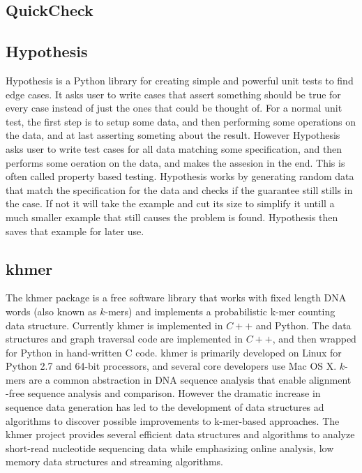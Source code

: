 \documentclass[preprint,nocopyrightspace]{sig-alternate}
\begin{document}
\subsection{QuickCheck}

\subsection{Hypothesis}
Hypothesis is a Python library for creating simple and powerful unit tests to find edge cases. It asks user to write cases that assert something should be true for every case instead of just the ones that could be thought of. For a normal unit test, the first step is to setup some data, and then performing some operations on the data, and at last asserting someting about the result. However Hypothesis asks user to write test cases for all data matching some specification, and then performs some oeration on the data, and makes the assesion in the end. This is often called property based testing. Hypothesis works by generating random data that match the specification for the data and checks if the guarantee still stills in the case. If not it will take the example and cut its size to simplify it untill a much smaller example that still causes the problem is found. Hypothesis then saves that example for later use.

\subsection{khmer}
The khmer package is a free software library that works with fixed length DNA words (also known as $k$-mers) and implements a probabilistic k-mer counting data structure. Currently khmer is implemented in $C++$ and Python. The data structures and graph traversal code are implemented in $C++$, and then wrapped for Python in hand-written C code. khmer is primarily developed on Linux for Python 2.7 and 64-bit processors, and several core developers use Mac OS X. $k$-mers are a common abstraction in DNA sequence analysis that enable alignment -free sequence analysis and comparison. However the dramatic increase in sequence data generation has led to the development of data structures ad algorithms to discover possible improvements to k-mer-based approaches. The khmer project provides several efficient data structures and algorithms to analyze short-read nucleotide sequencing data while emphasizing online analysis, low memory data structures and streaming algorithms.
\end{document}
